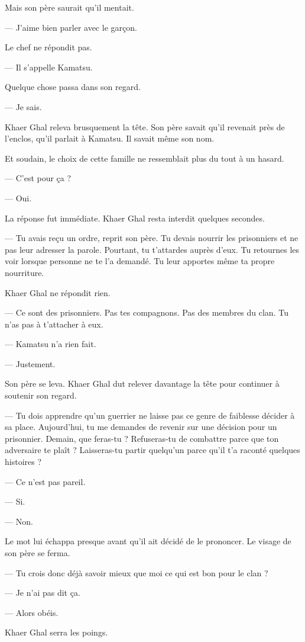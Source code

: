 Mais son père saurait qu'il mentait.

— J'aime bien parler avec le garçon.

Le chef ne répondit pas.

— Il s'appelle Kamatsu.

Quelque chose passa dans son regard.

— Je sais.

Khaer Ghal releva brusquement la tête. Son père savait qu'il revenait près de
l'enclos, qu'il parlait à Kamatsu. Il savait même son nom.

Et soudain, le choix de cette famille ne ressemblait plus du tout à un hasard.

— C'est pour ça ?

— Oui.

La réponse fut immédiate. Khaer Ghal resta interdit quelques secondes.

— Tu avais reçu un ordre, reprit son père. Tu devais nourrir les prisonniers et
ne pas leur adresser la parole. Pourtant, tu t'attardes auprès d'eux. Tu
retournes les voir lorsque personne ne te l'a demandé. Tu leur apportes même ta
propre nourriture.

Khaer Ghal ne répondit rien.

— Ce sont des prisonniers. Pas tes compagnons. Pas des membres du clan. Tu n'as
pas à t'attacher à eux.

— Kamatsu n'a rien fait.

— Justement.

Son père se leva. Khaer Ghal dut relever davantage la tête pour continuer à
soutenir son regard.

— Tu dois apprendre qu'un guerrier ne laisse pas ce genre de faiblesse décider
à sa place. Aujourd'hui, tu me demandes de revenir sur une décision pour un
prisonnier. Demain, que feras-tu ? Refuseras-tu de combattre parce que ton
adversaire te plaît ? Laisseras-tu partir quelqu'un parce qu'il t'a raconté
quelques histoires ?

— Ce n'est pas pareil.

— Si.

— Non.

Le mot lui échappa presque avant qu'il ait décidé de le prononcer. Le visage de
son père se ferma.

— Tu crois donc déjà savoir mieux que moi ce qui est bon pour le clan ?

— Je n'ai pas dit ça.

— Alors obéis.

Khaer Ghal serra les poings.

